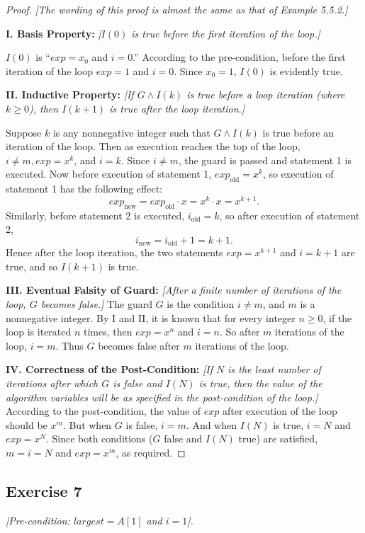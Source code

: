 \documentclass[14pt]{extarticle}
\begin{document}
\begin{proof}
{\it [The wording of this proof is almost the same as
that of Example 5.5.2.]}

{\bf I. Basis Property:} {\it [$I(0)$ is true before the first iteration of the loop.]}

$I(0)$ is “$exp = x_0$ and $i = 0$.” According to the pre-condition, before the first iteration of the loop
$exp = 1$ and $i = 0$. Since $x_0 = 1$, $I(0)$ is evidently true.

{\bf II. Inductive Property:} {\it [If $G \wedge I(k)$ is true before a loop iteration (where $k \geq 0$), then 
$I(k + 1)$ is true after the loop iteration.]} 

Suppose $k$ is any nonnegative integer such that $G \wedge I(k)$ is true before an iteration of the loop. Then as 
execution reaches the top of the loop, $i \neq m, exp = x^k$, and $i = k$. Since $i \neq m$, the guard is passed 
and statement 1 is executed. Now before execution of statement 1, $exp_{\text{old}} = x^k$, so execution of 
statement 1 has the following effect: 
\[
exp_{\text{new}} = exp_{\text{old}} \cdot x = x^k \cdot x = x^{k+1}.
\]
Similarly, before statement 2 is executed, $i_{\text{old}} = k$, so after execution of statement 2,
\[
i_{\text{new}} = i_{\text{old}} + 1 = k + 1.
\]
Hence after the loop iteration, the two statements $exp = x^{k+1}$ and $i = k + 1$ are true, and so $I(k + 1)$ is true.

{\bf III. Eventual Falsity of Guard:} {\it [After a finite number of iterations of the loop, $G$ becomes false.]} The 
guard $G$ is the condition $i \neq m$, and $m$ is a nonnegative integer. By I and II, it is known that for 
every integer $n \geq 0$, if the loop is iterated $n$ times, then $exp = x^n$ and $i = n$. So after $m$ 
iterations of the loop, $i = m$. Thus $G$ becomes false after $m$ iterations of the loop. 

{\bf IV. Correctness of the Post-Condition:} {\it [If $N$ is the least number of iterations after which $G$ is false 
and $I(N)$ is true, then the value of the algorithm variables will be as specified in the post-condition of the 
loop.]} According to the post-condition, the value of $exp$ after execution of the loop should be $x^m$. But when $G$ 
is false, $i = m$. And when $I(N)$ is true, $i = N$ and $exp = x^N$. Since both conditions ($G$ false and $I(N)$ 
true) are satisfied, $m = i = N$ and $exp = x^m$, as required.
\end{proof}

\subsection{Exercise 7}
{\it [Pre-condition: $largest = A[1]$ and $i = 1$].}
\end{document}
